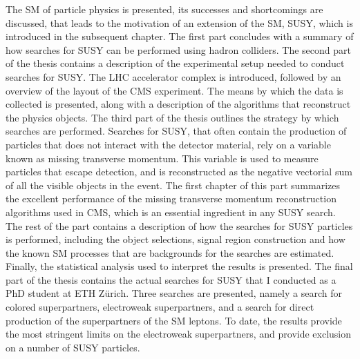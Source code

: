 The SM of particle physics is presented, its successes and shortcomings are discussed, that leads to the motivation of an extension of the SM, SUSY, which is introduced in the subsequent chapter. 
The first part concludes with a summary of how searches for SUSY can be performed using hadron colliders. 
\newpara
\noindent\justify
The second part of the thesis contains a description of the experimental setup needed to conduct searches for SUSY. 
The LHC accelerator complex is introduced, followed by an overview of the layout of the CMS experiment. 
The means by which the data is collected is presented, along with a description of the algorithms that reconstruct the physics objects.  
\newpara
\noindent\justify
The third part of the thesis outlines the strategy by which searches are performed. 
Searches for SUSY, that often contain the production of particles that does not interact with the detector material, rely on a variable known as missing transverse momentum. 
This variable is used to measure particles that escape detection, and is reconstructed as the negative vectorial sum of all the visible objects in the event. 
The first chapter of this part summarizes the excellent performance of the missing transverse momentum reconstruction algorithms used in CMS, which is an essential ingredient in any SUSY search. 
The rest of the part contains a description of how the searches for SUSY particles is performed, including the object selections, signal region construction and how the known SM processes that are backgrounds for the searches are estimated. 
Finally, the statistical analysis used to interpret the results is presented.   
\newpara
\noindent\justify
The final part of the thesis contains the actual searches for SUSY that I conducted as a PhD student at ETH Z\"{u}rich. 
Three searches are presented, namely a search for colored superpartners, electroweak superpartners, and a search for direct production of the superpartners of the SM leptons. 
To date, the results provide the most stringent limits on the electroweak superpartners, and provide exclusion on a number of SUSY particles.   



